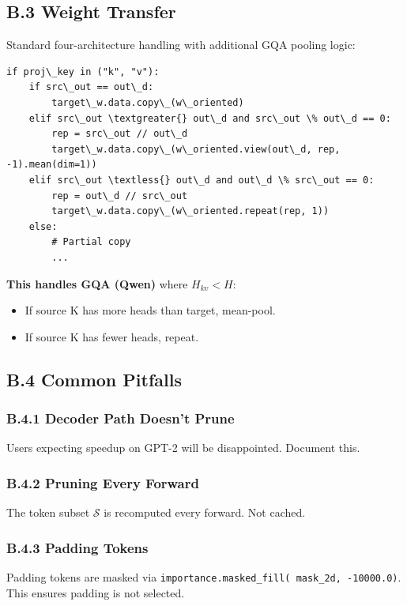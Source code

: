 \subsection{B.3 Weight Transfer}

Standard four-architecture handling with additional GQA pooling logic:

\begin{lstlisting}
if proj\_key in ("k", "v"):
    if src\_out == out\_d:
        target\_w.data.copy\_(w\_oriented)
    elif src\_out \textgreater{} out\_d and src\_out \% out\_d == 0:
        rep = src\_out // out\_d
        target\_w.data.copy\_(w\_oriented.view(out\_d, rep, -1).mean(dim=1))
    elif src\_out \textless{} out\_d and out\_d \% src\_out == 0:
        rep = out\_d // src\_out
        target\_w.data.copy\_(w\_oriented.repeat(rep, 1))
    else:
        # Partial copy
        ...
\end{lstlisting}

\textbf{This handles GQA (Qwen)} where $H_{kv} < H$:
\begin{itemize}
\item If source K has more heads than target, mean-pool.
\item If source K has fewer heads, repeat.

\end{itemize}
\subsection{B.4 Common Pitfalls}

\subsubsection{B.4.1 Decoder Path Doesn't Prune}

Users expecting speedup on GPT-2 will be disappointed. Document this.

\subsubsection{B.4.2 Pruning Every Forward}

The token subset $\mathcal{S}$ is recomputed every forward. Not cached.

\subsubsection{B.4.3 Padding Tokens}

Padding tokens are masked via \texttt{importance.masked\_fill(~mask\_2d, -10000.0)}. 
This ensures padding is not selected.

